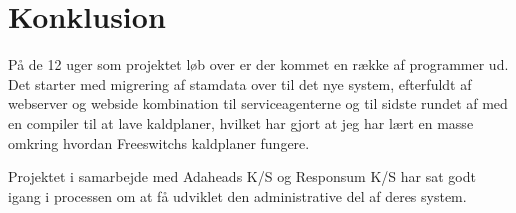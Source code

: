 \chapter{Konklusion}
På de 12 uger som projektet løb over er der kommet en række af programmer ud. Det starter med migrering af stamdata over til det nye system, efterfuldt af webserver og webside kombination til serviceagenterne og til sidste rundet af med en compiler til at lave kaldplaner, hvilket har gjort at jeg har lært en masse omkring hvordan Freeswitchs kaldplaner fungere.


Projektet i samarbejde med Adaheads K/S og Responsum K/S har sat godt igang i processen om at få udviklet den administrative del af deres system.